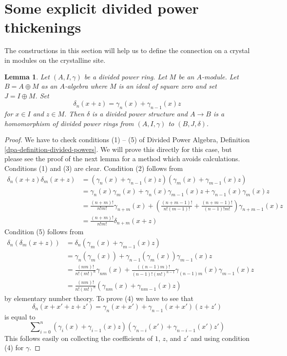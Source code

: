 \documentclass{stacks-project}
\theoremstyle{plain}
\newtheorem{lemma}[subsection]{Lemma}
\theoremstyle{definition}
\theoremstyle{remark}
\numberwithin{equation}{subsection}
\begin{document}
\section{Some explicit divided power thickenings}
\label{section-explicit-thickenings}

\noindent
The constructions in this section will help us to define the connection
on a crystal in modules on the crystalline site.

\begin{lemma}
\label{lemma-divided-power-first-order-thickening}
Let $(A, I, \gamma)$ be a divided power ring. Let $M$ be an $A$-module.
Let $B = A \oplus M$ as an $A$-algebra where $M$ is an ideal of square zero
and set $J = I \oplus M$. Set
$$
\delta_n(x + z) = \gamma_n(x) + \gamma_{n - 1}(x)z
$$
for $x \in I$ and $z \in M$.
Then $\delta$ is a divided power structure and
$A \to B$ is a homomorphism of divided power rings from
$(A, I, \gamma)$ to $(B, J, \delta)$.
\end{lemma}

\begin{proof}
We have to check conditions (1) -- (5) of
Divided Power Algebra, Definition \ref{dpa-definition-divided-powers}.
We will prove this directly for this case, but please see the proof of
the next lemma for a method which avoids calculations.
Conditions (1) and (3) are clear. Condition (2) follows from
\begin{align*}
\delta_n(x + z)\delta_m(x + z)
& =
(\gamma_n(x) + \gamma_{n - 1}(x)z)(\gamma_m(x) + \gamma_{m - 1}(x)z) \\
& = \gamma_n(x)\gamma_m(x) + \gamma_n(x)\gamma_{m - 1}(x)z +
\gamma_{n - 1}(x)\gamma_m(x)z \\
& =
\frac{(n + m)!}{n!m!} \gamma_{n + m}(x) +
\left(\frac{(n + m - 1)!}{n!(m - 1)!} +
\frac{(n + m - 1)!}{(n - 1)!m!}\right)
\gamma_{n + m - 1}(x) z \\
& =
\frac{(n + m)!}{n!m!}\delta_{n + m}(x + z)
\end{align*}
Condition (5) follows from
\begin{align*}
\delta_n(\delta_m(x + z))
& =
\delta_n(\gamma_m(x) + \gamma_{m - 1}(x)z) \\
& =
\gamma_n(\gamma_m(x)) + \gamma_{n - 1}(\gamma_m(x))\gamma_{m - 1}(x)z \\
& =
\frac{(nm)!}{n! (m!)^n} \gamma_{nm}(x) +
\frac{((n - 1)m)!}{(n - 1)! (m!)^{n - 1}}
\gamma_{(n - 1)m}(x) \gamma_{m - 1}(x) z \\
& = \frac{(nm)!}{n! (m!)^n}(\gamma_{nm}(x) + \gamma_{nm - 1}(x) z)
\end{align*}
by elementary number theory. To prove (4) we have to see that
$$
\delta_n(x + x' + z + z')
=
\gamma_n(x + x') + \gamma_{n - 1}(x + x')(z + z')
$$
is equal to
$$
\sum\nolimits_{i = 0}^n
(\gamma_i(x) + \gamma_{i - 1}(x)z)
(\gamma_{n - i}(x') + \gamma_{n - i - 1}(x')z')
$$
This follows easily on collecting the coefficients of
$1$, $z$, and $z'$ and using condition (4) for $\gamma$.
\end{proof}
\end{document}
